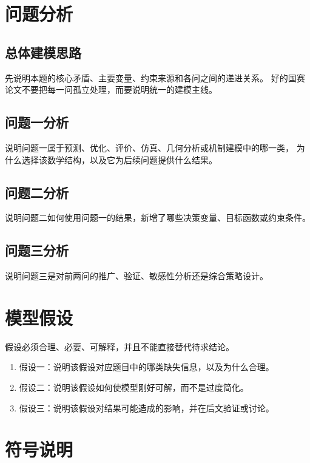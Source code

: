 \documentclass[12pt,a4paper]{ctexart}
\begin{document}
\section{问题分析}

\subsection{总体建模思路}

先说明本题的核心矛盾、主要变量、约束来源和各问之间的递进关系。
好的国赛论文不要把每一问孤立处理，而要说明统一的建模主线。

\subsection{问题一分析}

说明问题一属于预测、优化、评价、仿真、几何分析或机制建模中的哪一类，
为什么选择该数学结构，以及它为后续问题提供什么结果。

\subsection{问题二分析}

说明问题二如何使用问题一的结果，新增了哪些决策变量、目标函数或约束条件。

\subsection{问题三分析}

说明问题三是对前两问的推广、验证、敏感性分析还是综合策略设计。

\section{模型假设}

假设必须合理、必要、可解释，并且不能直接替代待求结论。

\begin{enumerate}
  \item 假设一：说明该假设对应题目中的哪类缺失信息，以及为什么合理。
  \item 假设二：说明该假设如何使模型刚好可解，而不是过度简化。
  \item 假设三：说明该假设对结果可能造成的影响，并在后文验证或讨论。
\end{enumerate}

\section{符号说明}
\end{document}
